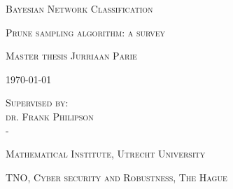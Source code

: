 \documentclass[a4paper, twoside, 11pt]{report}
\theoremstyle{plain}
\theoremstyle{definition}
\theoremstyle{remark}
\begin{document}






\begin{titlepage}
	\centering
	\vspace{1cm}

	{
		\huge
		\textsc{Bayesian Network Classification}
	}
	
	\vspace{0.25cm}
	
	{
		\large
		\textsc{Prune sampling algorithm: a survey}
	}

	\vspace{1.5cm}

	{
		\Large
		\textsc{Master thesis Jurriaan Parie}
	}

	\vspace{1cm}

	{
		\large
		\textsc{\today}
	}
	
		\vspace{2cm}
	
	{
		\large
		\textsc{Supervised by: \\
		dr. Frank Philipson\\
		-}
	}
	
	\vspace{3cm}
	
	{
		\large
		\textsc{Mathematical Institute, Utrecht University}
	}
		
	\vspace{0.5cm}
		
	{
		\large
		\textsc{TNO, Cyber security and Robustness, The Hague}
	}
	
	\vspace{2cm}
%	
	
\end{titlepage}


\pagestyle{plain}





\end{document}
